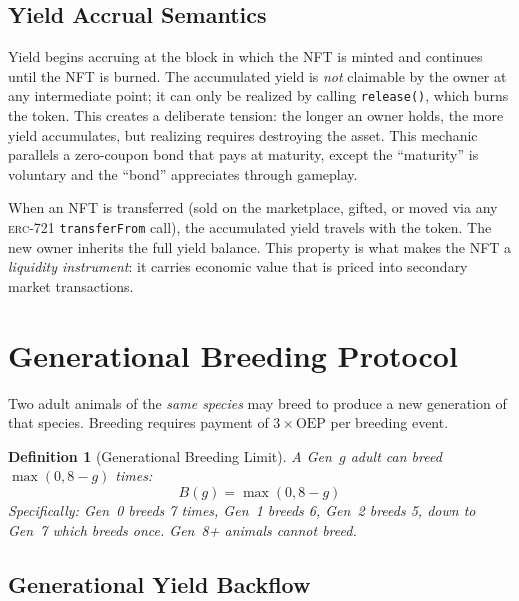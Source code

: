 \documentclass[11pt,letterpaper]{article}
\newtheorem{definition}{Definition}[section]
\newcommand{\ERC}{\textsc{erc}}
\newcommand{\OEP}{\text{OEP}}
\begin{document}
\subsection{Yield Accrual Semantics}

Yield begins accruing at the block in which the NFT is minted and continues until the
NFT is burned.  The accumulated yield is \emph{not} claimable by the owner at any
intermediate point; it can only be realized by calling \texttt{release()}, which burns
the token.  This creates a deliberate tension: the longer an owner holds, the more
yield accumulates, but realizing requires destroying the asset.  This mechanic parallels
a zero-coupon bond that pays at maturity, except the ``maturity'' is voluntary and the
``bond'' appreciates through gameplay.

When an NFT is transferred (sold on the marketplace, gifted, or moved via any \ERC{}-721
\texttt{transferFrom} call), the accumulated yield travels with the token.  The new owner
inherits the full yield balance.  This property is what makes the NFT a \emph{liquidity
instrument}: it carries economic value that is priced into secondary market transactions.

\section{Generational Breeding Protocol}
\label{sec:breeding}

Two adult animals of the \emph{same species} may breed to produce a new generation of that species.  Breeding requires payment of $3 \times \OEP$ per breeding event.

\begin{definition}[Generational Breeding Limit]
A Gen~$g$ adult can breed $\max(0, 8 - g)$ times:
\begin{equation}
B(g) = \max(0, 8 - g)
\label{eq:breed-limit}
\end{equation}
Specifically: Gen~0 breeds 7 times, Gen~1 breeds 6, Gen~2 breeds 5, down to Gen~7 which breeds once.  Gen~8+ animals cannot breed.
\end{definition}

\subsection{Generational Yield Backflow}
\end{document}
